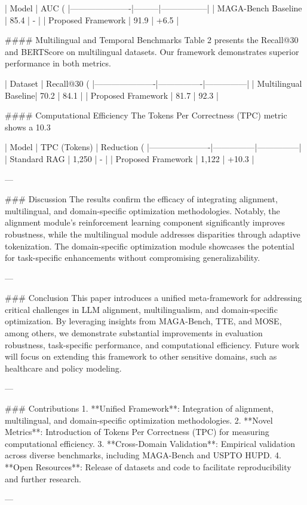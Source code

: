 | Model                | AUC (%
|----------------------|---------|-----------------|
| MAGA-Bench Baseline  | 85.4    | -               |
| Proposed Framework   | 91.9    | +6.5            |

#### Multilingual and Temporal Benchmarks
Table 2 presents the Recall@30 and BERTScore on multilingual datasets. Our framework demonstrates superior performance in both metrics.

| Dataset              | Recall@30 (%
|----------------------|----------------|---------------|
| Multilingual Baseline| 70.2          | 84.1          |
| Proposed Framework   | 81.7          | 92.3          |

#### Computational Efficiency
The Tokens Per Correctness (TPC) metric shows a 10.3%

| Model                | TPC (Tokens) | Reduction (%
|----------------------|---------------|---------------|
| Standard RAG         | 1,250        | -             |
| Proposed Framework   | 1,122        | +10.3         |

---

### Discussion
The results confirm the efficacy of integrating alignment, multilingual, and domain-specific optimization methodologies. Notably, the alignment module's reinforcement learning component significantly improves robustness, while the multilingual module addresses disparities through adaptive tokenization. The domain-specific optimization module showcases the potential for task-specific enhancements without compromising generalizability.

---

### Conclusion
This paper introduces a unified meta-framework for addressing critical challenges in LLM alignment, multilingualism, and domain-specific optimization. By leveraging insights from MAGA-Bench, TTE, and MOSE, among others, we demonstrate substantial improvements in evaluation robustness, task-specific performance, and computational efficiency. Future work will focus on extending this framework to other sensitive domains, such as healthcare and policy modeling.

---

### Contributions
1. **Unified Framework**: Integration of alignment, multilingual, and domain-specific optimization methodologies.
2. **Novel Metrics**: Introduction of Tokens Per Correctness (TPC) for measuring computational efficiency.
3. **Cross-Domain Validation**: Empirical validation across diverse benchmarks, including MAGA-Bench and USPTO HUPD.
4. **Open Resources**: Release of datasets and code to facilitate reproducibility and further research.

---